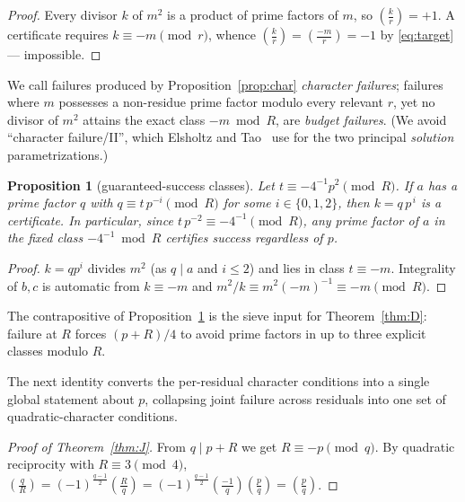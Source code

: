 \documentclass[11pt]{article}
\theoremstyle{plain}
\newtheorem{proposition}[theorem]{Proposition}
\theoremstyle{remark}
\theoremstyle{plain}
\numberwithin{equation}{section}
\newcommand{\legendre}[2]{\genfrac{(}{)}{}{1}{#1}{#2}}
\begin{document}
\begin{proof}
Every divisor $k$ of $m^2$ is a product of prime factors of $m$, so
$\legendre{k}{r} = +1$. A certificate requires $k \equiv -m \pmod r$,
whence $\legendre{k}{r} = \legendre{-m}{r} = -1$ by \eqref{eq:target} ---
impossible.
\end{proof}

We call failures produced by Proposition~\ref{prop:char}
\emph{character failures}; failures where $m$ possesses a non-residue
prime factor modulo every relevant $r$, yet no divisor of $m^2$
attains the exact class $-m \bmod R$, are \emph{budget failures}.
(We avoid ``character failure/II'', which Elsholtz and Tao~\cite{ElsholtzTao}
use for the two principal \emph{solution} parametrizations.)

\begin{proposition}[guaranteed-success classes]\label{prop:succ}
Let $t \equiv -4^{-1}p^2 \pmod R$. If $a$ has a prime factor $q$ with
$q \equiv t\,p^{-i} \pmod R$ for some $i \in \{0, 1, 2\}$, then
$k = q\,p^{\,i}$ is a certificate. In particular, since
$t\,p^{-2} \equiv -4^{-1} \pmod R$, any prime factor of $a$ in the fixed
class $-4^{-1} \bmod R$ certifies success regardless of $p$.
\end{proposition}

\begin{proof}
$k = q p^i$ divides $m^2$ (as $q \mid a$ and $i \le 2$) and lies in class
$t \equiv -m$. Integrality of $b, c$ is automatic from
$k \equiv -m$ and $m^2/k \equiv m^2(-m)^{-1} \equiv -m \pmod R$.
\end{proof}

The contrapositive of Proposition~\ref{prop:succ} is the sieve input for
Theorem~\ref{thm:D}: failure at $R$ forces $(p+R)/4$ to avoid prime
factors in up to three explicit classes modulo $R$.

The next identity converts the per-residual character conditions into a
single global statement about $p$, collapsing joint failure across
residuals into one set of quadratic-character conditions.

\begin{proof}[Proof of Theorem~\ref{thm:J}]
From $q \mid p+R$ we get $R \equiv -p \pmod q$. By quadratic
reciprocity with $R \equiv 3 \pmod 4$,
$\legendre{q}{R} = (-1)^{\frac{q-1}{2}} \legendre{R}{q}
 = (-1)^{\frac{q-1}{2}} \legendre{-1}{q} \legendre{p}{q}
 = \legendre{p}{q}$.
\end{proof}
\end{document}

